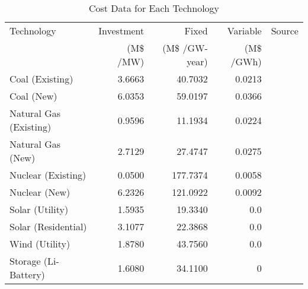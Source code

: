 \begin{table*}[h]
  \centering
  \caption{Cost Data for Each Technology}
  \label{tab:cost-data}
  \begin{tabular}{l rrr c}
    \hline
    Technology & Investment & Fixed & Variable & Source\\
    &  (M\$ /MW) & (M\$ /GW-year) & (M\$ /GWh) &  \\
    \hline
    Coal (Existing) & 3.6663 & 40.7032 & 0.0213 & \cite{nrel_national_renewable_energy_laboratory_2020_2020}\\
    Coal (New) & 6.0353 & 59.0197 & 0.0366 & \cite{nrel_national_renewable_energy_laboratory_2020_2020}\\
    Natural Gas (Existing) & 0.9596 & 11.1934 & 0.0224 & \cite{nrel_national_renewable_energy_laboratory_2020_2020}\\
    Natural Gas (New) & 2.7129 & 27.4747 & 0.0275 & \cite{nrel_national_renewable_energy_laboratory_2020_2020}\\
    Nuclear (Existing) & 0.0500 & 177.7374 & 0.0058 & \cite{desai_nuclear_2020}\\
    Nuclear (New) & 6.2326 & 121.0922 & 0.0092 & \cite{nrel_national_renewable_energy_laboratory_2020_2020}\\
    Solar (Utility) & 1.5935 & 19.3340 & 0.0 & \cite{nrel_national_renewable_energy_laboratory_2020_2020}\\
    Solar (Residential)& 3.1077 & 22.3868 & 0.0 & \cite{nrel_national_renewable_energy_laboratory_2020_2020}\\
    Wind (Utility) & 1.8780 & 43.7560 & 0.0 & \cite{nrel_national_renewable_energy_laboratory_2020_2020}\\
    Storage (Li-Battery) & 1.6080 & 34.1100 & 0 & \cite{nrel_national_renewable_energy_laboratory_2020_2020}\\
    \hline
  \end{tabular}
\end{table*}

